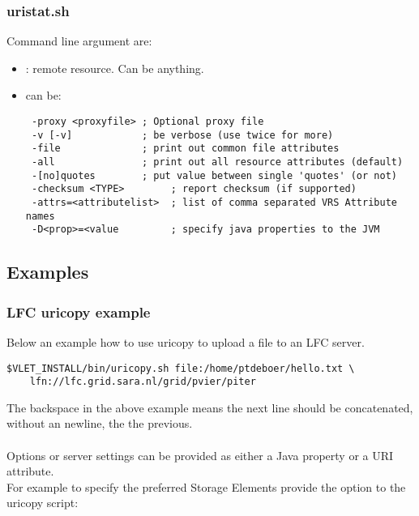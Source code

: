 \subsubsection{uristat.sh}

\tab {} 

Command line argument are: 
\begin{itemize}
  \item {} : remote resource. Can be anything.
  \item \Path{ [options] } can be: 

\hspace*{10mm}\begin{minipage}{170mm}
\begin{verbatim} 
 -proxy <proxyfile> ; Optional proxy file  
 -v [-v]            ; be verbose (use twice for more)
 -file              ; print out common file attributes
 -all               ; print out all resource attributes (default)
 -[no]quotes        ; put value between single 'quotes' (or not)
 -checksum <TYPE>        ; report checksum (if supported)
 -attrs=<attributelist>  ; list of comma separated VRS Attribute names
 -D<prop>=<value         ; specify java properties to the JVM
\end{verbatim}
\end{minipage}
\end{itemize}


\subsection{Examples} 

\subsubsection{LFC uricopy example}

Below an example how to use uricopy to upload a file to an LFC server. 

\hspace*{10mm}\begin{minipage}{170mm}
\begin{verbatim}
$VLET_INSTALL/bin/uricopy.sh file:/home/ptdeboer/hello.txt \
	lfn://lfc.grid.sara.nl/grid/pvier/piter
\end{verbatim}
\end{minipage}

The backspace in the above example means the next line should be concatenated,
without an newline, the the previous. \\
\\
Options or server settings can be provided as either a Java property or a URI
attribute. \\
For example to specify the preferred Storage Elements provide the
\Emph{lfc.listPreferredSEs} option to the uricopy script:\\

